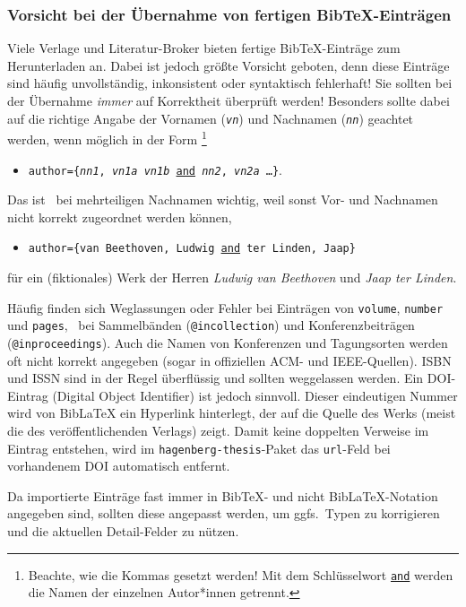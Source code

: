 \subsubsection{Vorsicht bei der Übernahme von fertigen BibTeX-Einträgen}

Viele Verlage und Literatur-Broker bieten fertige BibTeX-Einträge zum
Herunterladen an. Dabei ist jedoch größte Vorsicht geboten, denn diese
Einträge sind häufig unvollständig, inkonsistent oder syntaktisch fehlerhaft!
Sie sollten bei der Übernahme \emph{immer} auf Korrektheit überprüft werden!
Besonders sollte dabei auf die richtige Angabe der Vornamen
(\texttt{\textit{vn}}) und Nachnamen (\texttt{\textit{nn}}) geachtet werden,
wenn möglich in der Form%
\footnote{Beachte, wie die Kommas gesetzt werden! Mit dem Schlüsselwort
\underline{\texttt{and}} werden die Namen der einzelnen Autor*innen getrennt.}
%
\begin{itemize}
\item[]
\texttt{author=\{\textit{nn1}, \textit{vn1a} \emph{vn1b} \underline{and}
\textit{nn2}, \textit{vn2a} \ldots \}}.
\end{itemize}
%
Das ist \va\ bei mehrteiligen Nachnamen wichtig, weil sonst Vor- und
Nachnamen nicht korrekt zugeordnet werden können, \zB
%
\begin{itemize}
\item[]
\texttt{author=\{van Beethoven, Ludwig \underline{and} ter Linden, Jaap\}}
\end{itemize}
%
für ein (fiktionales) Werk der Herren \emph{Ludwig van Beethoven} und
\emph{Jaap ter Linden}.

Häufig finden sich Weglassungen oder Fehler bei Einträgen von
\texttt{volume}, \texttt{number} und \texttt{pages}, \va\ bei Sammelbänden
(\texttt{@incollection}) und Konferenzbeiträgen (\texttt{@inproceedings}).
Auch die Namen von Konferenzen und Tagungsorten werden oft nicht korrekt
angegeben (sogar in offiziellen ACM- und IEEE-Quellen). ISBN und
ISSN sind in der Regel überflüssig und sollten weggelassen werden.
Ein DOI-Eintrag (Digital Object Identifier) ist jedoch sinnvoll. Dieser
eindeutigen Nummer wird von BibLaTeX ein Hyperlink hinterlegt, der auf die
Quelle des Werks (meist die des veröffentlichenden Verlags) zeigt. Damit
keine doppelten Verweise im Eintrag entstehen, wird im
\texttt{hagenberg-thesis}-Paket das \texttt{url}-Feld bei vorhandenem DOI
automatisch entfernt.

Da importierte Einträge fast immer in BibTeX- und nicht BibLaTeX-Notation
angegeben sind, sollten diese angepasst werden, um ggfs.\ Typen zu
korrigieren und die aktuellen Detail-Felder zu nützen.


